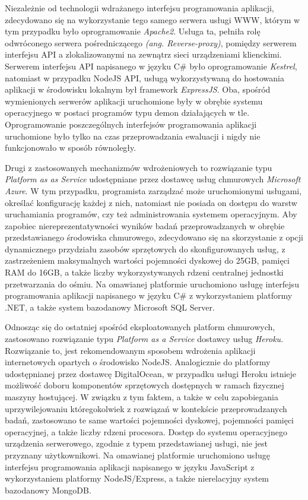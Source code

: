 Niezależnie od technologii wdrażanego interfejsu programowania aplikacji, zdecydowano się na wykorzystanie tego samego serwera usługi WWW, którym w tym przypadku było oprogramowanie \textit{Apache2}. Usługa ta, pełniła rolę odwróconego serwera pośredniczącego \textit{(ang. Reverse-proxy)}, pomiędzy serwerem interfejsu API a zlokalizowanymi na zewnątrz sieci urządzeniami klienckimi. Serwerem interfejsu API napisanego w języku C\# było oprogramowanie \textit{Kestrel}, natomiast w przypadku NodeJS API, usługą wykorzystywaną do hostowania aplikacji w środowisku lokalnym był framework \textit{ExpressJS}. Oba, spośród wymienionych serwerów aplikacji uruchomione były w obrębie systemu operacyjnego w postaci programów typu demon działających w tle. Oprogramowanie poszczególnych interfejsów programowania aplikacji uruchomione było tylko na czas przeprowadzania ewaluacji i nigdy nie funkcjonowało w sposób równoległy.

Drugi z zastosowanych mechanizmów wdrożeniowych to rozwiązanie typu \textit{Platform as as Service} udostępniane przez dostawcę usług chmurowych \textit{Microsoft Azure}. W tym przypadku, programista zarządzać może uruchomionymi usługami, określać konfigurację każdej z nich, natomiast nie posiada on dostępu do warstw uruchamiania programów, czy też administrowania systemem operacyjnym. Aby zapobiec niereprezentatywności wyników badań przeprowadzanych w obrębie przedstawianego środowiska chmurowego, zdecydowano się na skorzystanie z opcji dynamicznego przydziału zasobów sprzętowych do skonfigurowanych usług, z zastrzeżeniem maksymalnych wartości pojemności dyskowej do 25GB, pamięci RAM do 16GB, a także liczby wykorzystywanych rdzeni centralnej jednostki przetwarzania do ośmiu. Na omawianej platformie uruchomiono usługę interfejsu programowania aplikacji napisanego w języku C\# z wykorzystaniem platformy .NET, a także system bazodanowy Microsoft SQL Server.

Odnosząc się do ostatniej spośród eksploatowanych platform chmurowych, zastosowano rozwiązanie typu \textit{Platform as a Service} dostawcy usług \textit{Heroku}. Rozwiązanie to, jest rekomendowanym sposobem wdrożenia aplikacji internetowych opartych o środowisko NodeJS. Analogicznie do platformy udostępnianej przez dostawcę DigitalOcean, w przypadku usługi Heroku istnieje możliwość doboru komponentów sprzętowych dostępnych w ramach fizycznej maszyny hostującej. W związku z tym faktem, a także w celu zapobiegania uprzywilejowaniu któregokolwiek z rozwiązań w kontekście przeprowadzanych badań, zastosowano te same wartości pojemności dyskowej, pojemności pamięci operacyjnej, a także liczby rdzeni procesora. Dostęp do systemu operacyjnego urządzenia serwerowego, zgodnie z typem przedstawianej usługi, nie jest przyznany użytkownikowi. Na omawianej platformie uruchomiono usługę interfejsu programowania aplikacji napisanego w języku JavaScript z wykorzystaniem platformy NodeJS/Express, a także nierelacyjny system bazodanowy MongoDB.
